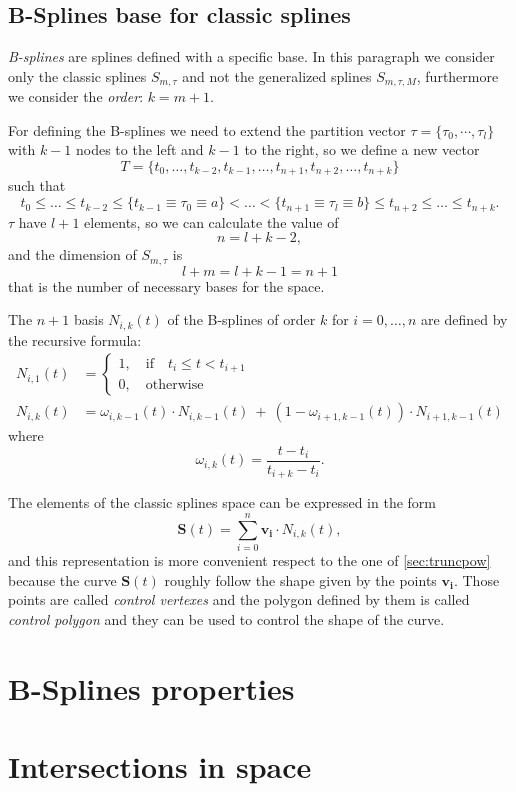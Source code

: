 \documentclass[dissertation.tex]{subfiles}
\begin{document}
\subsection{B-Splines base for classic splines}\label{sec:bsplines}
\emph{B-splines} are splines defined with a specific base. In this
paragraph we consider only the classic splines $S_{m,\tau}$ and not
the generalized splines $S_{m,\tau,M}$, furthermore we consider the
\emph{order}: $k=m+1$.

For defining the B-splines we need to extend the partition vector
$\tau=\{\tau_0,\cdots,\tau_l\}$ with $k-1$ nodes to the left and $k-1$ to
the right, so we define a new vector
$$
T=\{t_0,\dots,t_{k-2},t_{k-1},\dots,t_{n+1},t_{n+2},\dots,t_{n+k}\}
$$
such that
$$
t_0\leq\dots\leq t_{k-2}\leq \{t_{k-1}\equiv\tau_0\equiv a\}<\dots<
\{t_{n+1}\equiv\tau_l\equiv b\}\leq t_{n+2}\leq\dots\leq t_{n+k}.
$$
$\tau$ have $l+1$ elements, so we can calculate the value of
$$
n=l+k-2,
$$
and the dimension of $S_{m,\tau}$ is
$$
l+m=l+k-1=n+1
$$
that is the number of necessary bases for the space.

The $n+1$ basis $N_{i,k}(t)$ of the B-splines of order $k$ for
$i=0,\dots,n$ are defined by the 
recursive formula:
\begin{align*}
  N_{i,1}(t) &=
  \begin{cases}
    1,\quad \mbox{if}\quad t_i\leq t<t_{i+1}\\
    0,\quad \mbox{otherwise}
  \end{cases}\\
  N_{i,k}(t) &= \omega_{i,k-1}(t)\cdot N_{i,k-1}(t)\ +\
  (1-\omega_{i+1,k-1}(t))\cdot N_{i+1,k-1}(t)
\end{align*}
where
$$
\omega_{i,k}(t) = \frac{t-t_i}{t_{i+k}-t_i}.
$$

The elements of the classic splines space can be expressed in the form
$$
\mathbf{S}(t)=\sum_{i=0}^n\mathbf{v_i}\cdot N_{i,k}(t),
$$
and this representation is more convenient respect to the one of
\cref{sec:truncpow} because the curve $\mathbf{S}(t)$ roughly
follow the shape given by the points $\mathbf{v_i}$. Those points are
called \emph{control vertexes} and the polygon defined by them is
called \emph{control polygon} and they can be used to control the
shape of the curve.

\section{B-Splines properties}

\section{Intersections in space}\label{sec:intersections}
\end{document}
